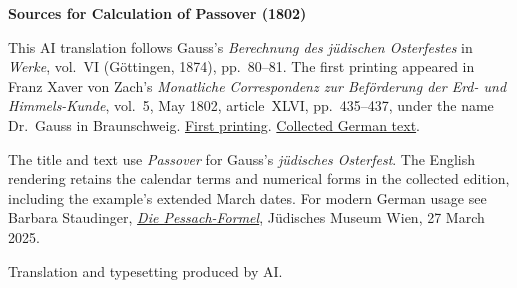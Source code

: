 \clearpage\thispagestyle{empty}
\begin{center}\textbf{Sources for Calculation of Passover (1802)}\end{center}
\noindent This AI translation follows Gauss’s \textit{Berechnung des jüdischen Osterfestes} in \textit{Werke}, vol.~VI (Göttingen, 1874), pp.~80--81. The first printing appeared in Franz Xaver von Zach’s \textit{Monatliche Correspondenz zur Beförderung der Erd- und Himmels-Kunde}, vol.~5, May 1802, article~XLVI, pp.~435--437, under the name Dr.~Gauss in Braunschweig. \href{https://www.digitale-sammlungen.de/de/view/bsb10538597?page=447}{First printing}. \href{https://gdz.sub.uni-goettingen.de/id/PPN236007467}{Collected German text}.
\par\smallskip\noindent The title and text use \textit{Passover} for Gauss’s \textit{jüdisches Osterfest}. The English rendering retains the calendar terms and numerical forms in the collected edition, including the example’s extended March dates. For modern German usage see Barbara Staudinger, \href{https://www.jmw.at/news/die_pessach-formel}{\textit{Die Pessach-Formel}}, Jüdisches Museum Wien, 27 March 2025.
\par\smallskip\noindent Translation and typesetting produced by AI.
\clearpage
